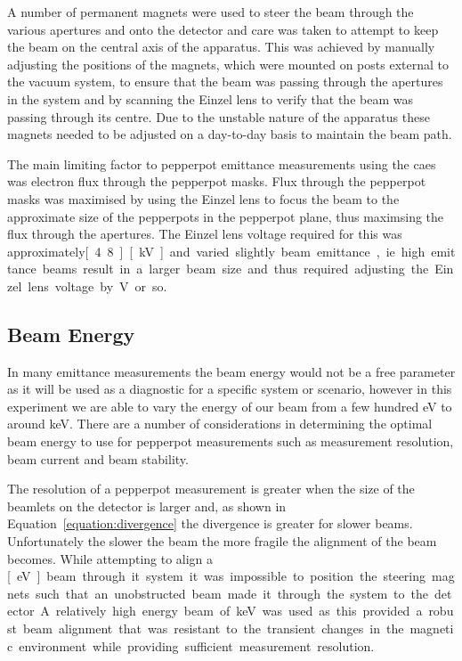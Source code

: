 A number of permanent magnets were used to steer the beam through the various apertures and onto the detector and care was taken to attempt to keep the beam on the central axis of the apparatus.
This was achieved by manually adjusting the positions of the magnets, which were mounted on posts external to the vacuum system, to ensure that the beam was passing through the apertures in the system and by scanning the Einzel lens to verify that the beam was passing through its centre.
Due to the unstable nature of the apparatus these magnets needed to be adjusted on a day-to-day basis to maintain the beam path.

The main limiting factor to pepperpot emittance measurements using the \gls{caes} was electron flux through the pepperpot masks.
Flux through the pepperpot masks was maximised by using the Einzel lens to focus the beam to the approximate size of the pepperpots in the pepperpot plane, thus maximsing the flux through the apertures.
The Einzel lens voltage required for this was approximately\unit[4.8][kV] and varied slightly beam emittance, ie. high emittance beams result in a larger beam size and thus required adjusting the Einzel lens voltage by \unit[100]{V} or so.

\subsection{Beam Energy}
In many emittance measurements the beam energy would not be a free parameter as it will be used as a diagnostic for a specific system or scenario, however in this experiment we are able to vary the energy of our beam from a few hundred eV to around \unit[10]{keV}.
There are a number of considerations in determining the optimal beam energy to use for pepperpot measurements such as measurement resolution, beam current and beam stability.

The resolution of a pepperpot measurement is greater when the size of the beamlets on the detector is larger and, as shown in Equation~\ref{equation:divergence} the divergence is greater for slower beams.
Unfortunately the slower the beam the more fragile the alignment of the beam becomes.
While attempting to align a \unit[500][eV] beam through it system it was impossible to position the steering magnets such that an unobstructed beam made it through the system to the detector.

A relatively high energy beam of \unit[8]{keV} was used as this provided a robust beam alignment that was resistant to the transient changes in the magnetic environment while providing sufficient measurement resolution.

